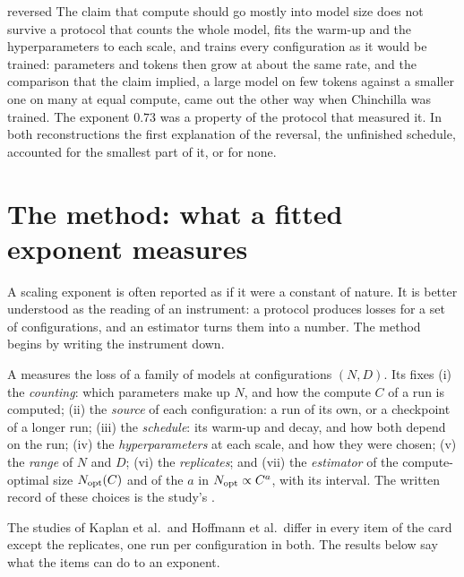 \begin{refsection}
\begin{verdict}{reversed}
The claim that compute should go mostly into model size does not survive a protocol that counts the whole model, fits the warm-up and the hyperparameters to each scale, and trains every configuration as it would be trained: parameters and tokens then grow at about the same rate, and the comparison that the claim implied, a large model on few tokens against a smaller one on many at equal compute, came out the other way when Chinchilla was trained. The exponent $0.73$ was a property of the protocol that measured it. In both reconstructions the first explanation of the reversal, the unfinished schedule, accounted for the smallest part of it, or for none.
\end{verdict}

\section{The method: what a fitted exponent measures}\label{sec:protocol:exponents}

A scaling exponent is often reported as if it were a constant of nature. It is better understood as the reading of an instrument: a protocol produces losses for a set of configurations, and an estimator turns them into a number. The method begins by writing the instrument down.

\begin{definition}\label{def:protocol:card}
A  measures the loss of a family of models at configurations $(N,D)$. Its  fixes (i) the \emph{counting}: which parameters make up $N$, and how the compute $C$ of a run is computed; (ii) the \emph{source} of each configuration: a run of its own, or a checkpoint of a longer run; (iii) the \emph{schedule}: its warm-up and decay, and how both depend on the run; (iv) the \emph{hyperparameters} at each scale, and how they were chosen; (v) the \emph{range} of $N$ and $D$; (vi) the \emph{replicates}; and (vii) the \emph{estimator} of the compute-optimal size $N_{\mathrm{opt}}(C)$ and of the  $a$ in $N_{\mathrm{opt}}\propto C^{a}$, with its interval. The written record of these choices is the study's .
\end{definition}

The studies of Kaplan et al.\ and Hoffmann et al.\ differ in every item of the card except the replicates, one run per configuration in both. The results below say what the items can do to an exponent.


\end{refsection}

